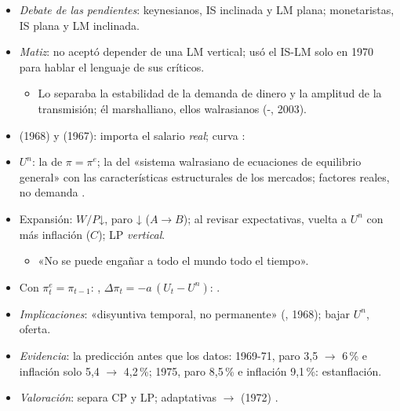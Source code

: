 \documentclass{article}
\begin{document}
\begin{columnas}
\begin{itemize}
\item \emph{Debate de las pendientes}: keynesianos, IS inclinada y LM plana; monetaristas, IS plana y LM inclinada.
\end{itemize}
\begin{itemize}
\item \emph{Matiz}:  no aceptó depender de una LM vertical; usó el IS-LM solo en 1970 para hablar el lenguaje de sus críticos.
  \begin{itemize}
  \item Lo separaba la estabilidad de la demanda de dinero y la amplitud de la transmisión; él marshalliano, ellos walrasianos (-, 2003).
  \end{itemize}
\end{itemize}
\begin{itemize}
\item {} (1968) y  (1967): importa el salario \emph{real}; curva  :
\item {} $U^n$: la de $\pi=\pi^e$; la del «sistema walrasiano de ecuaciones de equilibrio general» con las características estructurales de los mercados; factores reales, no demanda .
\item Expansión: $W/P$↓, paro ↓ ($A\to B$); al revisar expectativas, vuelta a $U^n$ con más inflación ($C$); LP \emph{vertical}.
  \begin{itemize}
  \item «No se puede engañar a todo el mundo todo el tiempo».
  \end{itemize}
\end{itemize}
\begin{itemize}
\item Con $\pi^e_t=\pi_{t-1}$: , $\Delta\pi_t=-a\,(U_t-U^n)$: .
\item \emph{Implicaciones}: «disyuntiva temporal, no permanente» (, 1968); bajar $U^n$, oferta.
\item \emph{Evidencia}: la predicción antes que los datos: 1969-71, paro 3,5 $\to$ 6\,\% e inflación solo 5,4 $\to$ 4,2\,\%; 1975, paro 8,5\,\% e inflación 9,1\,\%: estanflación.
\item \emph{Valoración}: separa CP y LP; adaptativas $\to$  (1972) .
\end{itemize}


\end{columnas}
\end{document}
